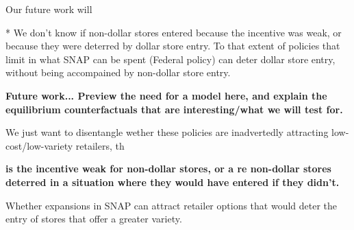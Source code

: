 \documentclass[12pt]{article}
\begin{document}
Our future work will 

* We don't know if non-dollar stores entered because the incentive was weak, or because they were deterred by dollar store entry. To that extent of policies that limit in what SNAP can be spent (Federal policy) can deter dollar store entry, without being accompained by non-dollar store entry. 


\textbf{Future work... Preview the need for a model here, and explain the equilibrium counterfactuals that are interesting/what we will test for.}

We just want to disentangle wether these policies are inadvertedly attracting low-cost/low-variety retailers, th


\textbf{is the incentive weak for non-dollar stores, or a re non-dollar stores deterred in a situation where they would have entered if they didn't.}


Whether expansions in SNAP can attract retailer options that would deter the entry of stores that offer a greater variety. 



\end{document}
